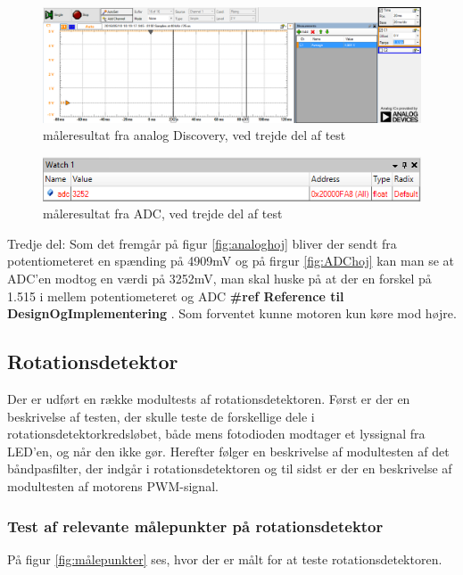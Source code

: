\begin{figure}[H]
	\centering
	\includegraphics[width=\textwidth]{test/images/ModultestADC/4904mVanalog}
	\caption{måleresultat fra analog Discovery, ved trejde del af test}
	\label{figure:analoghoj}
\end{figure}
\begin{figure}[H]
	\centering
	\includegraphics[width=\textwidth]{test/images/ModultestADC/opDebug}
	\caption{måleresultat fra ADC, ved trejde del af test}
	\label{figure: ADChoj}
\end{figure}
Tredje del: Som det fremgår på figur \ref{fig:analoghoj} bliver der sendt fra potentiometeret en spænding på 4909mV og på firgur \ref{fig:ADChoj}  kan man se at ADC’en modtog en værdi på 3252mV, man skal huske på at der en forskel på 1.515 i mellem potentiometeret og ADC \textbf{\#ref Reference til DesignOgImplementering }. 
Som forventet kunne motoren kun køre mod højre.


\subsection{Rotationsdetektor}
Der er udført en række modultests af rotationsdetektoren. Først er der en beskrivelse af testen, der skulle teste de forskellige dele i rotationsdetektorkredsløbet, både mens fotodioden modtager et lyssignal fra LED'en, og når den ikke gør. Herefter følger en beskrivelse af modultesten af det båndpasfilter, der indgår i rotationsdetektoren og til sidst er der en beskrivelse af modultesten af motorens PWM-signal. 

\subsubsection{Test af relevante målepunkter på rotationsdetektor}
På figur \ref{fig:målepunkter} ses, hvor der er målt for at teste rotationsdetektoren. 

